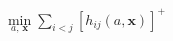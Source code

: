 \documentclass[preview]{standalone}
\begin{document}
\begin{align*}
\min_{a,\, \mathbf{x}} \sum_{i<j} [h_{ij}(a,\mathbf{x})]^+
\end{align*}
\end{document}
